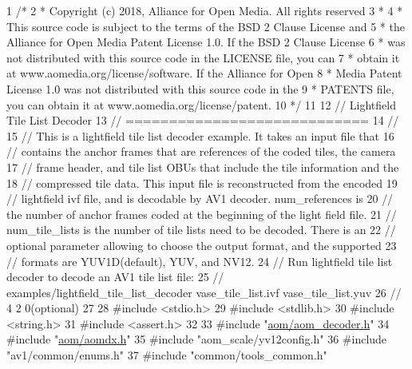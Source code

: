 \begin{DoxyCodeInclude}
1 \textcolor{comment}{/*}
2 \textcolor{comment}{ * Copyright (c) 2018, Alliance for Open Media. All rights reserved}
3 \textcolor{comment}{ *}
4 \textcolor{comment}{ * This source code is subject to the terms of the BSD 2 Clause License and}
5 \textcolor{comment}{ * the Alliance for Open Media Patent License 1.0. If the BSD 2 Clause License}
6 \textcolor{comment}{ * was not distributed with this source code in the LICENSE file, you can}
7 \textcolor{comment}{ * obtain it at www.aomedia.org/license/software. If the Alliance for Open}
8 \textcolor{comment}{ * Media Patent License 1.0 was not distributed with this source code in the}
9 \textcolor{comment}{ * PATENTS file, you can obtain it at www.aomedia.org/license/patent.}
10 \textcolor{comment}{ */}
11 
12 \textcolor{comment}{// Lightfield Tile List Decoder}
13 \textcolor{comment}{// ============================}
14 \textcolor{comment}{//}
15 \textcolor{comment}{// This is a lightfield tile list decoder example. It takes an input file that}
16 \textcolor{comment}{// contains the anchor frames that are references of the coded tiles, the camera}
17 \textcolor{comment}{// frame header, and tile list OBUs that include the tile information and the}
18 \textcolor{comment}{// compressed tile data. This input file is reconstructed from the encoded}
19 \textcolor{comment}{// lightfield ivf file, and is decodable by AV1 decoder. num\_references is}
20 \textcolor{comment}{// the number of anchor frames coded at the beginning of the light field file.}
21 \textcolor{comment}{// num\_tile\_lists is the number of tile lists need to be decoded. There is an}
22 \textcolor{comment}{// optional parameter allowing to choose the output format, and the supported}
23 \textcolor{comment}{// formats are YUV1D(default), YUV, and NV12.}
24 \textcolor{comment}{// Run lightfield tile list decoder to decode an AV1 tile list file:}
25 \textcolor{comment}{// examples/lightfield\_tile\_list\_decoder vase\_tile\_list.ivf vase\_tile\_list.yuv}
26 \textcolor{comment}{// 4 2 0(optional)}
27 
28 \textcolor{preprocessor}{#include <stdio.h>}
29 \textcolor{preprocessor}{#include <stdlib.h>}
30 \textcolor{preprocessor}{#include <string.h>}
31 \textcolor{preprocessor}{#include <assert.h>}
32 
33 \textcolor{preprocessor}{#include "\hyperlink{aom__decoder_8h}{aom/aom\_decoder.h}"}
34 \textcolor{preprocessor}{#include "\hyperlink{aomdx_8h}{aom/aomdx.h}"}
35 \textcolor{preprocessor}{#include "aom\_scale/yv12config.h"}
36 \textcolor{preprocessor}{#include "av1/common/enums.h"}
37 \textcolor{preprocessor}{#include "common/tools\_common.h"}

\end{DoxyCodeInclude}
